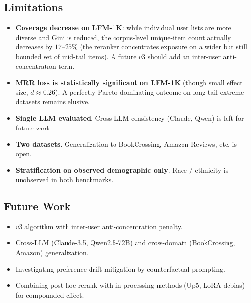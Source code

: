 \subsection{Limitations}

\begin{itemize}
\item \textbf{Coverage decrease on LFM-1K}: while individual user lists are more diverse and Gini is reduced, the corpus-level unique-item count actually decreases by $17$--$25\%$ (the reranker concentrates exposure on a wider but still bounded set of mid-tail items). A future $v3$ should add an inter-user anti-concentration term.
\item \textbf{MRR loss is statistically significant on LFM-1K} (though small effect size, $d \approx 0.26$). A perfectly Pareto-dominating outcome on long-tail-extreme datasets remains elusive.
\item \textbf{Single LLM evaluated}. Cross-LLM consistency (Claude, Qwen) is left for future work.
\item \textbf{Two datasets}. Generalization to BookCrossing, Amazon Reviews, etc. is open.
\item \textbf{Stratification on observed demographic only}. Race / ethnicity is unobserved in both benchmarks.
\end{itemize}

\subsection{Future Work}

\begin{itemize}
\item $v3$ algorithm with inter-user anti-concentration penalty.
\item Cross-LLM (Claude-3.5, Qwen2.5-72B) and cross-domain (BookCrossing, Amazon) generalization.
\item Investigating preference-drift mitigation by counterfactual prompting.
\item Combining post-hoc rerank with in-processing methods (Up5, LoRA debias) for compounded effect.
\end{itemize}
